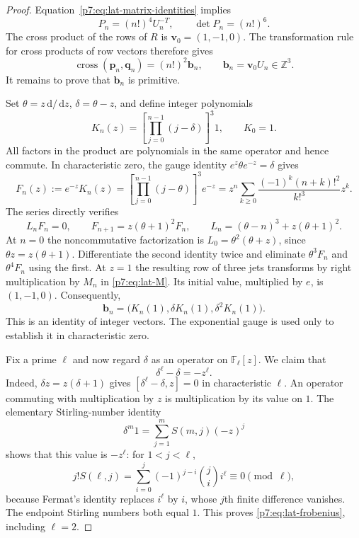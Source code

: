 \documentclass[11pt,a4paper]{article}
\theoremstyle{definition}
\theoremstyle{remark}
\newcommand{\Z}{\mathbb Z}
\newcommand{\dd}{\,\mathrm d}
\numberwithin{equation}{section}
\begin{document}
\begin{proof}
Equation~\eqref{p7:eq:lat-matrix-identities} implies
\[
P_n=(n!)^4U_n^{-T},\qquad \det P_n=(n!)^6.
\]
The cross product of the rows of $R$ is $\mathbf v_0=(1,-1,0)$.
The transformation rule for cross products of row vectors therefore gives
\begin{equation}\label{p7:eq:lat-cross}
\operatorname{cross}(\mathbf p_n,\mathbf q_n)
=(n!)^2\mathbf b_n,\qquad \mathbf b_n=\mathbf v_0U_n\in\Z^3.
\end{equation}
It remains to prove that $\mathbf b_n$ is primitive.

Set $\theta=z\dd/\dd z$, $\delta=\theta-z$, and define integer
polynomials
\begin{equation}\label{p7:eq:lat-K}
K_n(z)=\left[\prod_{j=0}^{n-1}(j-\delta)\right]^3 1,
\qquad K_0=1.
\end{equation}
All factors in the product are polynomials in the same operator and hence
commute.  In characteristic zero, the gauge identity
$e^z\theta e^{-z}=\delta$ gives
\[
F_n(z):=e^{-z}K_n(z)
=\left[\prod_{j=0}^{n-1}(j-\theta)\right]^3e^{-z}
=z^n\sum_{k\geq0}\frac{(-1)^k(n+k)!^2}{k!^3}z^k.
\]
The series directly verifies
\begin{equation}\label{p7:eq:lat-forward}
L_nF_n=0,\qquad F_{n+1}=z(\theta+1)^2F_n,
\qquad L_n=(\theta-n)^3+z(\theta+1)^2.
\end{equation}
At $n=0$ the noncommutative factorization is
$L_0=\theta^2(\theta+z)$, since $\theta z=z(\theta+1)$.
Differentiate the second identity twice and eliminate $\theta^3F_n$ and
$\theta^4F_n$ using the first.  At $z=1$ the resulting row of three
jets transforms by right multiplication by $M_n$ in
\eqref{p7:eq:lat-M}.  Its initial value, multiplied by $e$, is
$(1,-1,0)$.  Consequently,
\begin{equation}\label{p7:eq:lat-integer-jets}
\mathbf b_n=\bigl(K_n(1),\delta K_n(1),\delta^2K_n(1)\bigr).
\end{equation}
This is an identity of integer vectors.  The exponential gauge is used
only to establish it in characteristic zero.

Fix a prime $\ell$ and now regard $\delta$ as an operator on
$\mathbb F_\ell[z]$.  We claim that
\begin{equation}\label{p7:eq:lat-frobenius}
\delta^\ell-\delta=-z^\ell.
\end{equation}
Indeed, $\delta z=z(\delta+1)$ gives
$[\delta^\ell-\delta,z]=0$ in characteristic $\ell$.  An operator
commuting with multiplication by $z$ is multiplication by its value on
$1$.  The elementary Stirling-number identity
\[
\delta^m1=\sum_{j=1}^m S(m,j)(-z)^j
\]
shows that this value is $-z^\ell$: for $1<j<\ell$,
\[
j!S(\ell,j)=\sum_{i=0}^j(-1)^{j-i}\binom ji i^\ell\equiv0\pmod\ell,
\]
because Fermat's identity replaces $i^\ell$ by $i$, whose $j$th finite
difference vanishes.  The endpoint Stirling numbers both equal $1$.
This proves \eqref{p7:eq:lat-frobenius}, including $\ell=2$.


\end{proof}
\end{document}
